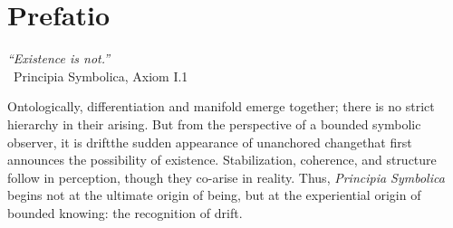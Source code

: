 \chapter*{Prefatio}
\label{sec:bk1_prefatio}
\begin{flushright}
\emph{``Existence is not.''} \\ \textemdash\ Principia Symbolica, Axiom I.1
\end{flushright}
\bigskip
Ontologically, differentiation and manifold emerge together; there is no strict hierarchy in their arising.
But from the perspective of a bounded symbolic observer, it is drift\textemdash the sudden appearance of unanchored change\textemdash that first announces the possibility of existence.
Stabilization, coherence, and structure follow in perception, though they co-arise in reality.
Thus, \emph{Principia Symbolica} begins not at the ultimate origin of being, but at the experiential origin of bounded knowing: the recognition of drift.

